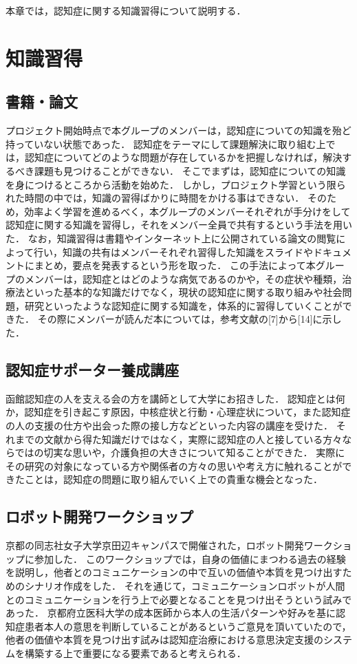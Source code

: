\documentclass[../report]{subfiles}
\begin{document}
本章では，認知症に関する知識習得について説明する．


\section{知識習得}
\subsection{書籍・論文}
プロジェクト開始時点で本グループのメンバーは，認知症についての知識を殆ど持っていない状態であった．
認知症をテーマにして課題解決に取り組む上では，認知症についてどのような問題が存在しているかを把握しなければ，解決するべき課題も見つけることができない．
そこでまずは，認知症についての知識を身につけるところから活動を始めた．
しかし，プロジェクト学習という限られた時間の中では，知識の習得ばかりに時間をかける事はできない．
そのため，効率よく学習を進めるべく，本グループのメンバーそれぞれが手分けをして認知症に関する知識を習得し，それをメンバー全員で共有するという手法を用いた．
なお，知識習得は書籍やインターネット上に公開されている論文の閲覧によって行い，知識の共有はメンバーそれぞれ習得した知識をスライドやドキュメントにまとめ，要点を発表するという形を取った．
この手法によって本グループのメンバーは，認知症とはどのような病気であるのかや，その症状や種類，治療法といった基本的な知識だけでなく，現状の認知症に関する取り組みや社会問題，研究といったような認知症に関する知識を，体系的に習得していくことができた．
その際にメンバーが読んだ本については，参考文献の[7]から[14]に示した．

\subsection{認知症サポーター養成講座}
函館認知症の人を支える会の方を講師として大学にお招きした．
認知症とは何か，認知症を引き起こす原因，中核症状と行動・心理症状について，また認知症の人の支援の仕方や出会った際の接し方などといった内容の講座を受けた．
それまでの文献から得た知識だけではなく，実際に認知症の人と接している方々ならではの切実な思いや，介護負担の大きさについて知ることができた．
実際にその研究の対象になっている方や関係者の方々の思いや考え方に触れることができたことは，認知症の問題に取り組んでいく上での貴重な機会となった．

\subsection{ロボット開発ワークショップ}
京都の同志社女子大学京田辺キャンパスで開催された，ロボット開発ワークショップに参加した．
このワークショップでは，自身の価値にまつわる過去の経験を説明し，他者とのコミュニケーションの中で互いの価値や本質を見つけ出すためのシナリオ作成をした．
それを通じて，コミュニケーションロボットが人間とのコミュニケーションを行う上で必要となることを見つけ出そうという試みであった．
京都府立医科大学の成本医師から本人の生活パターンや好みを基に認知症患者本人の意思を判断していることがあるというご意見を頂いていたので，他者の価値や本質を見つけ出す試みは認知症治療における意思決定支援のシステムを構築する上で重要になる要素であると考えられる．
\end{document}
